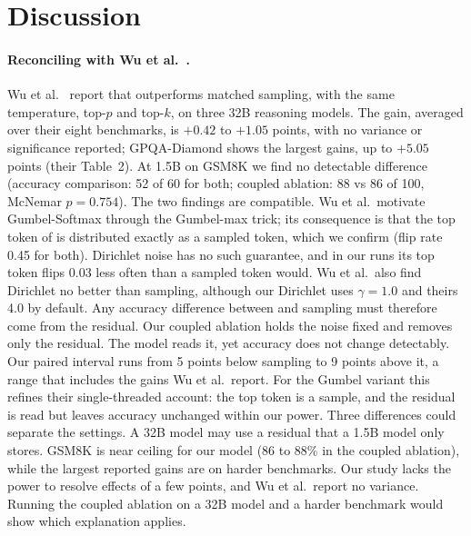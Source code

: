 \section{Discussion}\label{sec:discussion}

\paragraph{Reconciling with Wu et al.~\cite{wu2025single}.}
Wu et al.~\cite{wu2025single} report that \GST{} outperforms matched sampling, with the same temperature, top-$p$ and top-$k$,
on three 32B reasoning models. %
The gain, averaged over their eight benchmarks, is $+0.42$ to $+1.05$ points, with no variance or significance %
reported; GPQA-Diamond shows the largest gains, up to $+5.05$ points (their Table~2). %
At 1.5B on GSM8K we find no detectable difference %
(accuracy comparison: 52 of 60 for both; coupled ablation: 88 vs 86 of 100, McNemar $p = 0.754$). %
The two findings are compatible.
Wu et al.\ motivate Gumbel-Softmax through the Gumbel-max trick; its consequence is that the top token of \GST{} is
distributed exactly as a sampled token, which we confirm (flip rate 0.45 for both). %
Dirichlet noise has no such guarantee, and in our runs its top token flips 0.03 less often than a sampled token %
would.
Wu et al.\ also find Dirichlet no better than sampling, although our Dirichlet uses $\gamma = 1.0$ %
and theirs 4.0 by default. %
Any accuracy difference between \GST{} and sampling must therefore come from the residual.
Our coupled ablation holds the noise fixed and removes only the residual.
The model reads it, yet accuracy does not change detectably.
Our paired interval runs from 5 points below sampling to 9 points above it, a range that includes the gains %
Wu et al.\ report.
For the Gumbel variant this refines their single-threaded account: the top token is a sample, and the residual is
read but leaves accuracy unchanged within our power.
Three differences could separate the settings.
A 32B model may use a residual that %
a 1.5B model only stores. %
GSM8K is near ceiling for our model (86 to 88\% in the coupled ablation), while the largest reported gains are on harder %
benchmarks.
Our study lacks the power to resolve effects of a few points, and Wu et al.\ report no variance.
Running the coupled ablation on a 32B model and a harder benchmark would show which explanation applies. %

